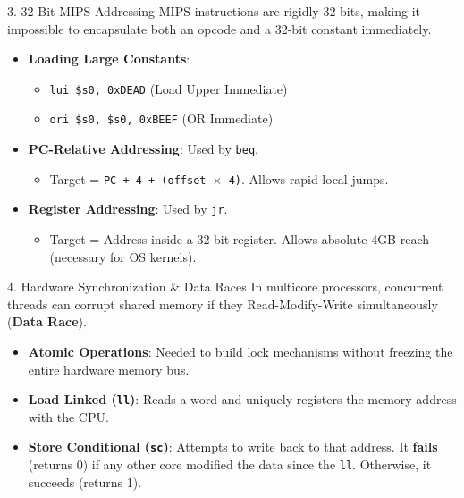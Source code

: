 \documentclass[aspectratio=169]{beamer}
\begin{document}
\begin{frame}{3. 32-Bit MIPS Addressing}
MIPS instructions are rigidly 32 bits, making it impossible to encapsulate both an opcode and a 32-bit constant immediately.
\vspace{0.2cm}
\begin{itemize}
    \item \textbf{Loading Large Constants}:
    \begin{itemize}
        \item \texttt{lui \$s0, 0xDEAD} (Load Upper Immediate)
        \item \texttt{ori \$s0, \$s0, 0xBEEF} (OR Immediate)
    \end{itemize}
    \vspace{0.2cm}
    \item \textbf{PC-Relative Addressing}: Used by \texttt{beq}.
    \begin{itemize}
        \item Target = \texttt{PC + 4 + (offset $\times$ 4)}. Allows rapid local jumps.
    \end{itemize}
    \vspace{0.2cm}
    \item \textbf{Register Addressing}: Used by \texttt{jr}.
    \begin{itemize}
        \item Target = Address inside a 32-bit register. Allows absolute 4GB reach (necessary for OS kernels).
    \end{itemize}
\end{itemize}
\end{frame}

\begin{frame}{4. Hardware Synchronization \& Data Races}
In multicore processors, concurrent threads can corrupt shared memory if they Read-Modify-Write simultaneously (\textbf{Data Race}).
\vspace{0.2cm}
\begin{itemize}
    \item \textbf{Atomic Operations}: Needed to build lock mechanisms without freezing the entire hardware memory bus.
    \item \textbf{Load Linked (\texttt{ll})}: Reads a word and uniquely registers the memory address with the CPU.
    \item \textbf{Store Conditional (\texttt{sc})}: Attempts to write back to that address. It \textbf{fails} (returns 0) if any other core modified the data since the \texttt{ll}. Otherwise, it succeeds (returns 1).
\end{itemize}
\end{frame}
\end{document}
